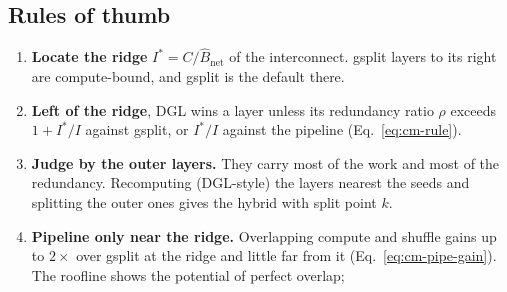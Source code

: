 \subsection{Rules of thumb}
\label{sec:pred-algo}

\begin{enumerate}\itemsep2pt
  \item \textbf{Locate the ridge} $I^{*} = C/\hat{B}_{\mathrm{net}}$ of the interconnect. gsplit
        layers to its right are compute-bound, and gsplit is the default there.
  \item \textbf{Left of the ridge}, DGL wins a layer unless its redundancy ratio $\rho$
        exceeds $1 + I^{*}/I$ against gsplit, or $I^{*}/I$ against the pipeline
        (Eq.~\eqref{eq:cm-rule}).
  \item \textbf{Judge by the outer layers.} They carry most of the work and most of the
        redundancy. Recomputing (DGL-style) the layers nearest the seeds and splitting the outer
        ones gives the hybrid with split point $k$.
  \item \textbf{Pipeline only near the ridge.} Overlapping compute and shuffle gains up to
        $2\times$ over gsplit at the ridge and little far from it (Eq.~\eqref{eq:cm-pipe-gain}).
        The roofline shows the potential of perfect overlap; 
\end{enumerate}
